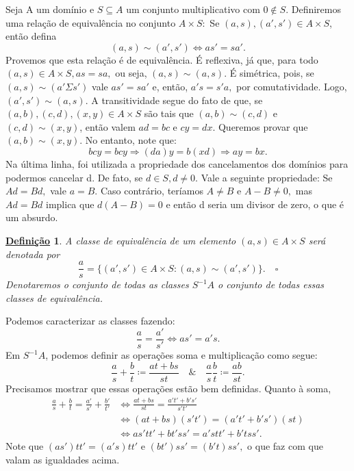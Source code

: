\documentclass{article}
\newtheorem*{def*}{\underline{Defini\c c\~ao}}
\begin{document}
Seja A um domínio e \(S\subseteq A\) um conjunto multiplicativo com \(0\not\in S.\) Definiremos uma relação de equivalência no conjunto
\(A\times S:\) Se \((a, s), (a', s')\in A\times S\), então defina 
\[
  (a, s)\sim (a', s') \Longleftrightarrow as' = sa'.
\]
Provemos que esta relação é de equivalência. É reflexiva, já que, para todo
\((a, s)\in A\times S, as = sa,\) ou seja, \((a, s)\sim (a, s).\) É simétrica, pois,
se \((a, s)\sim (a'\Sigma s')\) vale \(as' = sa'\) e, então, \(a's = s'a, \) por comutatividade. 
Logo, \((a', s')\sim (a, s).\) A transitividade segue do fato de que, se \((a, b), (c, d), (x, y)\in A\times S\) são
tais que \((a, b)\sim (c, d)\) e \((c, d)\sim (x, y)\), então valem \(ad = bc\) e \(cy = dx.\) Queremos provar
que \((a, b)\sim (x, y)\). No entanto, note que:
\[
  bcy = bcy \Rightarrow (da)y = b(xd) \Rightarrow ay = bx.
\]
Na última linha, foi utilizada a propriedade dos cancelamentos dos domínios para podermos cancelar d. De fato, se \(d\in S, d\neq 0.\)
Vale a seguinte propriedade: Se \(Ad = Bd,\) vale \(a = B.\) Caso contrário, teríamos \(A\neq B\) e \(A - B\neq 0,\) mas \(Ad = Bd\) implica que
\(d(A-B) = 0\) e então d seria um divisor de zero, o que é um absurdo.

\begin{def*}
  A classe de equivalência de um elemento \((a, s)\in A\times S\) será denotada por 
  \[
    \frac{a}{s} = \{(a', s')\in A\times S: (a, s)\sim (a', s')\}.\quad\square
  \] 
  Denotaremos o conjunto de todas as classes \(S^{-1}A\) o conjunto de todas essas classes de equivalência. 
\end{def*}
Podemos caracterizar as classes fazendo:
\[
  \frac{a}{s} = \frac{a'}{s'} \Longleftrightarrow as'=a's.
\]
Em \(S^{-1}A\), podemos definir as operações soma e multiplicação como segue:
\[
  \frac{a}{s}+\frac{b}{t}\coloneqq \frac{at+bs}{st}\quad\&\quad \frac{a}{s}\frac{b}{t}\coloneqq \frac{ab}{st}.
\]
Precisamos mostrar que essas operações estão bem definidas. Quanto à soma,
\begin{align*}
  \frac{a}{s} + \frac{b}{t} = \frac{a'}{s'} + \frac{b'}{t'} &\Longleftrightarrow \frac{at+bs}{st} = \frac{a't' + b's'}{s't'}\\
                                                            &\Longleftrightarrow (at+bs)(s't') = (a't'+b's')(st)\\
                                                            &\Longleftrightarrow as't t'+bt'ss' = a'st t' + b'tss'.
\end{align*}
Note que \((as')t t' = (a's)t t'\) e \((bt')ss' = (b't)ss',\) o que faz com que valam as igualdades acima.
\end{document}
